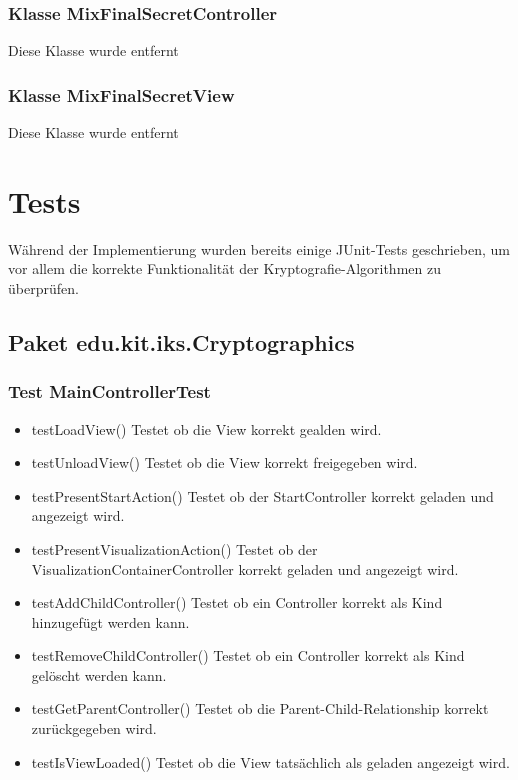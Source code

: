 \documentclass{article}
\begin{document}
	\subsubsection{Klasse MixFinalSecretController}
    Diese Klasse wurde entfernt\newline

	\subsubsection{Klasse MixFinalSecretView}
    Diese Klasse wurde entfernt\newline

\section{Tests}
Während der Implementierung wurden bereits einige JUnit-Tests geschrieben, um vor allem die korrekte Funktionalität
der Kryptografie-Algorithmen zu überprüfen.
  
  \subsection{Paket edu.kit.iks.Cryptographics}
  \subsubsection{Test MainControllerTest}
  \begin{itemize}
    \item testLoadView()\newline
          Testet ob die View korrekt gealden wird.
    \item testUnloadView()\newline
          Testet ob die View korrekt freigegeben wird.
    \item testPresentStartAction()\newline
          Testet ob der StartController korrekt geladen und angezeigt wird.
    \item testPresentVisualizationAction()\newline
          Testet ob der VisualizationContainerController korrekt geladen und angezeigt wird.
    \item testAddChildController()\newline
          Testet ob ein Controller korrekt als Kind hinzugefügt werden kann.
    \item testRemoveChildController()\newline
          Testet ob ein Controller korrekt als Kind gelöscht werden kann.
    \item testGetParentController()\newline
          Testet ob die Parent-Child-Relationship korrekt zurückgegeben wird.
    \item testIsViewLoaded()\newline
         Testet ob die View tatsächlich als geladen angezeigt wird.
  \end{itemize}
\end{document}
